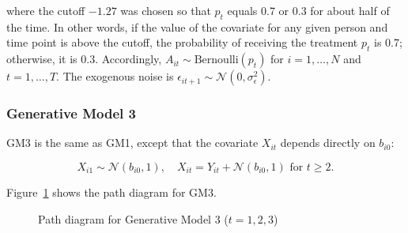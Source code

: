 \documentclass[
  12pt,
  a4paper,
]{article}
\begin{document}
where the cutoff \(-1.27\) was chosen so that \(p_t\) equals 0.7 or 0.3
for about half of the time. In other words, if the value of the
covariate for any given person and time point is above the cutoff, the
probability of receiving the treatment \(p_t\) is 0.7; otherwise, it is
0.3. Accordingly, \(A_{it} \sim \text{Bernoulli}(p_t)\) for
\(i = 1, \ldots, N\) and \(t = 1, \ldots, T\). The exogenous noise is
\(\epsilon_{it+1} \sim \mathcal{N}(0, \sigma_\epsilon^2)\).

\subsubsection{Generative Model 3}\label{generative-model-3}

GM3 is the same as GM1, except that the covariate \(X_{it}\) depends
directly on \(b_{i0}\):

\[
X_{i1} \sim \mathcal{N}(b_{i0}, 1), \quad X_{it} = Y_{it} + \mathcal{N}(b_{i0}, 1) \text{ for } t \geq 2.
\]

Figure~\ref{fig-GM3_path} shows the path diagram for GM3.

\begin{figure}[H]

\caption{\label{fig-GM3_path}Path diagram for Generative Model 3
(\(t = 1, 2, 3\))}


\end{figure}%
\end{document}
